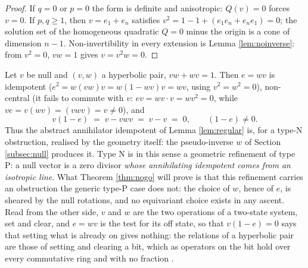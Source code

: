 \begin{proof}
If $q = 0$ or $p = 0$ the form is definite and anisotropic: $Q(v) = 0$ forces $v = 0$. If $p, q \geq 1$, then $v = e_1 + e_n$ satisfies $v^2 = 1 - 1 + (e_1e_n + e_ne_1) = 0$; the solution set of the homogeneous quadratic $Q = 0$ minus the origin is a cone of dimension $n-1$. Non-invertibility in every extension is Lemma \ref{lem:noinverse}: from $v^2 = 0$, $vw = 1$ gives $v = v^2 w = 0$.
\end{proof}

\begin{example}\label{ex:hyperbolic-idem}
Let $v$ be null and $(v, w)$ a hyperbolic pair, $vw + wv = 1$. Then $e = wv$ is idempotent ($e^2 = w(vw)v = w(1 - wv)v = wv$, using $v^2 = w^2 = 0$), non-central (it fails to commute with $v$: $ev = wv\cdot v = wv^2 = 0$, while $ve = v(wv) = (vwv) = v \neq 0$), and
\[
v(1 - e)\;=\;v - vwv \;=\; v - v \;=\; 0 , \qquad (1-e) \ne 0.
\]
Thus the abstract annihilator idempotent of Lemma \ref{lem:regular} is, for a type-N obstruction, realised by the geometry itself: the pseudo-inverse $w$ of Section \ref{subsec:null} produces it. Type N is in this sense a geometric refinement of type P: a null vector is a zero divisor \emph{whose annihilating idempotent comes from an isotropic line}. What Theorem \ref{thm:nogo} will prove is that this refinement carries an obstruction the generic type-P case does not: the choice of $w$, hence of $e$, is sheared by the null rotations, and no equivariant choice exists in any ascent. Read from the other side, $v$ and $w$ are the two operations of a two-state system, set and clear, and $e = wv$ is the test for its off state, so that $v(1 - e) = 0$ says that setting what is already on gives nothing: the relations of a hyperbolic pair are those of setting and clearing a bit, which as operators on the bit hold over every commutative ring and with no fraction \cite[Theorem 7.2]{ButlerT0a}.
\end{example}

